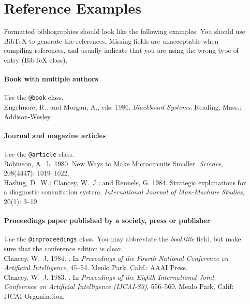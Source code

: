 \section{Reference Examples}
\label{sec:reference_examples}

Formatted bibliographies should look like the following examples. You should use BibTeX to generate the references. Missing fields are unacceptable when compiling references, and usually indicate that you are using the wrong type of entry (BibTeX class).

\paragraph{Book with multiple authors} Use the \texttt{@book} class.\\[.2em]
\nocite{em:86}
Engelmore, R.; and Morgan, A., eds. 1986.
\newblock \emph{Blackboard Systems}.
\newblock Reading, Mass.: Addison-Wesley.

\paragraph{Journal and magazine articles} Use the \texttt{@article} class.\\[.2em]
\nocite{r:80}
Robinson, A.~L. 1980.
\newblock New Ways to Make Microcircuits Smaller.
\newblock \emph{Science}, 208(4447): 1019--1022.\\[.2em]
\nocite{hcr:83}
Hasling, D.~W.; Clancey, W.~J.; and Rennels, G. 1984.
\newblock Strategic explanations for a diagnostic consultation system.
\newblock \emph{International Journal of Man-Machine Studies}, 20(1): 3--19.

\paragraph{Proceedings paper published by a society, press or publisher} Use the \texttt{@inproceedings} class. You may abbreviate the \emph{booktitle} field, but make sure that the conference edition is clear.\\[.2em]
\nocite{c:84}
Clancey, W.~J. 1984.
.
\newblock In \emph{Proceedings of the Fourth National Conference on Artificial
  Intelligence}, 45--54. Menlo Park, Calif.: AAAI Press.\\[.2em]
\nocite{c:83}
Clancey, W.~J. 1983.
.
\newblock In \emph{Proceedings of the Eighth International Joint Conference on
  Artificial Intelligence {(IJCAI-83)}}, 556--560. Menlo Park, Calif: {IJCAI
  Organization}.

